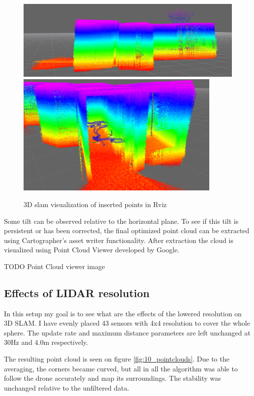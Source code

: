 \begin{figure}[!h]
    \centering
	\includegraphics[width=120mm, keepaspectratio]{figures/09_pointcloud2.png}
    \includegraphics[height=60mm, keepaspectratio]{figures/09_pointcloud3.png}
    \caption{3D slam visualization of inserted points in Rviz}
    \label{fig:09_3d_pointclouds}
\end{figure}

Some tilt can be observed relative to the horizontal plane. To see if this tilt is
persistent or has been corrected, the final optimized point cloud can be extracted using 
Cartographer's asset writer functionality. After extraction the cloud is visualized using Point Cloud
Viewer developed by Google.

TODO Point Cloud viewer image

\subsection{Effects of LIDAR resolution}
In this setup my goal is to see what are the effects of the lowered resolution on 3D SLAM. I have 
evenly placed 43 sensors with 4x4 resolution to cover the whole sphere. The update rate and maximum
distance parameters are left unchanged at 30Hz and 4.0m respectively.

The resulting point cloud is seen on figure \ref{fig:10_pointclouds}. Due to the averaging, 
the corners became curved, but all in all the algorithm was able to follow the drone accurately
and map its surroundings. The stability was unchanged relative to the unfiltered data.


